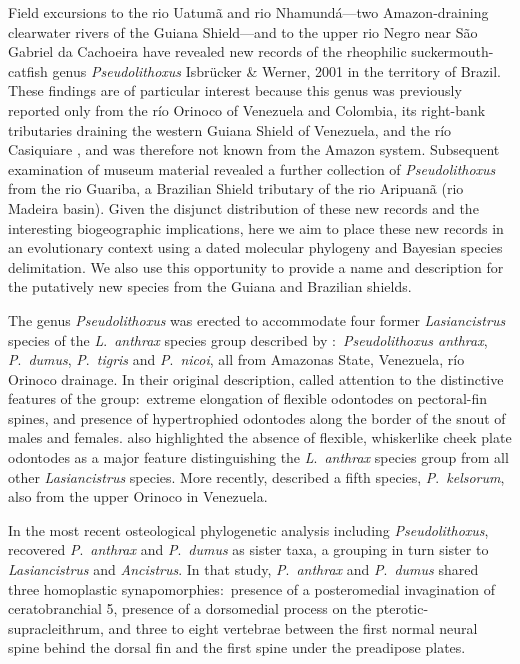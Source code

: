 \documentclass[12pt]{article}
\begin{document}
Field excursions to the rio Uatumã and rio Nhamundá---two Amazon-draining clearwater rivers of the Guiana Shield---and to the upper rio Negro near São Gabriel da Cachoeira have revealed new records of the rheophilic suckermouth-catfish genus \emph{Pseudolithoxus} Isbrücker \& Werner, 2001 in the territory of Brazil. %
These findings are of particular interest because this genus was previously reported only from the río Orinoco of Venezuela and Colombia, its right-bank tributaries draining the western Guiana Shield of Venezuela, and the río Casiquiare \citep{Armbruster2000,Lujan2011kelsorum}, and was therefore not known from the Amazon system. %
Subsequent examination of museum material revealed a further collection of \emph{Pseudolithoxus} from the rio Guariba, a Brazilian Shield tributary of the rio Aripuanã (rio Madeira basin). %
Given the disjunct distribution of these new records and the interesting biogeographic implications, here we aim to place these new records in an evolutionary context using a dated molecular phylogeny and Bayesian species delimitation. %
We also use this opportunity to provide a name and description for the putatively new species from the Guiana and Brazilian shields.

The genus \emph{Pseudolithoxus} was erected to accommodate four former \emph{Lasiancistrus} species of the \emph{L}.\ \emph{anthrax} species group described by \citet{Armbruster2000}:\ \emph{Pseudolithoxus anthrax}, \emph{P}.\ \emph{dumus}, \emph{P}.\ \emph{tigris} and \emph{P}.\ \emph{nicoi}, all from Amazonas State, Venezuela, río Orinoco drainage. %
In their original description, \citet{Armbruster2000} called attention to the distinctive features of the group:\ extreme elongation of flexible odontodes on pectoral-fin spines, and presence of hypertrophied odontodes along the border of the snout of males and females. %
\citet{Armbruster2000} also highlighted the absence of flexible, whiskerlike cheek plate odontodes as a major feature distinguishing the \emph{L}.\ \emph{anthrax} species group from all other \emph{Lasiancistrus} species. %
More recently, \citet{Lujan2011kelsorum} described a fifth species, \emph{P}.\ \emph{kelsorum}, also from the upper Orinoco in Venezuela.%

In the most recent osteological phylogenetic analysis including \emph{Pseudolithoxus}, \citet{Armbruster2008} recovered \emph{P}.\ \emph{anthrax} and \emph{P}.\ \emph{dumus} as sister taxa, a grouping in turn sister to \emph{Lasiancistrus} and \emph{Ancistrus}. %
In that study, \emph{P}.\ \emph{anthrax} and \emph{P}.\ \emph{dumus} shared three homoplastic synapomorphies:\ presence of a posteromedial invagination of ceratobranchial 5, presence of a dorsomedial process on the pterotic-supracleithrum, and three to eight vertebrae between the first normal neural spine behind the dorsal fin and the first spine under the preadipose plates.%
\end{document}
